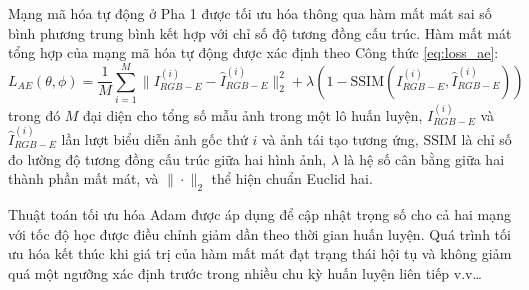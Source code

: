 Mạng mã hóa tự động ở Pha 1 được tối ưu hóa thông qua hàm mất mát sai số bình phương trung bình kết hợp với chỉ số độ tương đồng cấu trúc. Hàm mất mát tổng hợp của mạng mã hóa tự động được xác định theo Công thức \ref{eq:loss_ae}:
\begin{equation}
\label{eq:loss_ae}
L_{AE}(\theta, \phi) = \frac{1}{M} \sum_{i=1}^{M} \| I_{RGB-E}^{(i)} - \hat{I}_{RGB-E}^{(i)} \|_2^2 + \lambda \left( 1 - \text{SSIM}(I_{RGB-E}^{(i)}, \hat{I}_{RGB-E}^{(i)}) \right)
\end{equation}
trong đó $M$ đại diện cho tổng số mẫu ảnh trong một lô huấn luyện, $I_{RGB-E}^{(i)}$ và $\hat{I}_{RGB-E}^{(i)}$ lần lượt biểu diễn ảnh gốc thứ $i$ và ảnh tái tạo tương ứng, $\text{SSIM}$ là chỉ số đo lường độ tương đồng cấu trúc giữa hai hình ảnh, $\lambda$ là hệ số cân bằng giữa hai thành phần mất mát, và $\|\cdot\|_2$ thể hiện chuẩn Euclid hai.

Thuật toán tối ưu hóa Adam được áp dụng để cập nhật trọng số cho cả hai mạng với tốc độ học được điều chỉnh giảm dần theo thời gian huấn luyện. Quá trình tối ưu hóa kết thúc khi giá trị của hàm mất mát đạt trạng thái hội tụ và không giảm quá một ngưỡng xác định trước trong nhiều chu kỳ huấn luyện liên tiếp v.v…